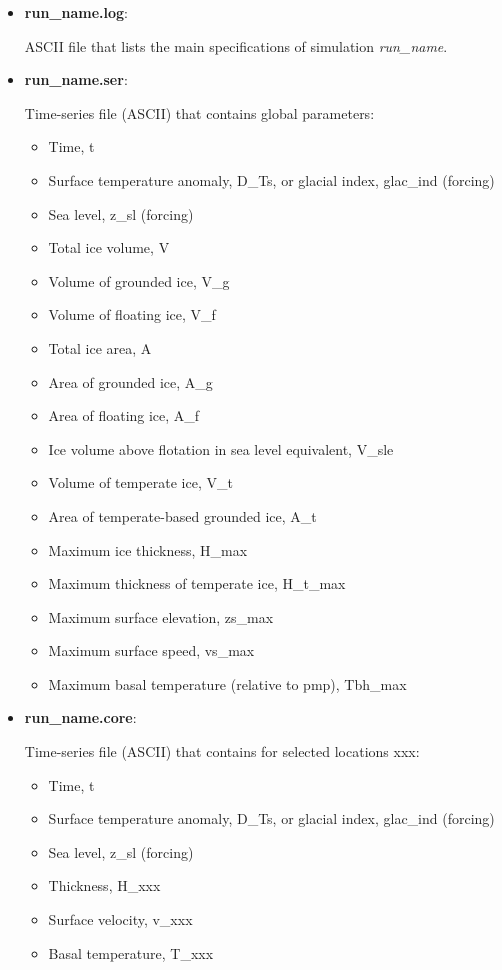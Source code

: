 \documentclass[12pt,a4paper]{article}
\begin{document}
\begin{itemize}

\item \textbf{run\_name.log}:

ASCII file that lists the main specifications of simulation \emph{run\_name}.

\item \textbf{run\_name.ser}:

Time-series file (ASCII) that contains global parameters:
\begin{itemize}
\item Time, t
\item Surface temperature anomaly, D\_Ts, or glacial index, glac\_ind (forcing)
\item Sea level, z\_sl (forcing)
\item Total ice volume, V
\item Volume of grounded ice, V\_g
\item Volume of floating ice, V\_f
\item Total ice area, A
\item Area of grounded ice, A\_g
\item Area of floating ice, A\_f
\item Ice volume above flotation in sea level equivalent, V\_sle
\item Volume of temperate ice, V\_t
\item Area of temperate-based grounded ice, A\_t
\item Maximum ice thickness, H\_max
\item Maximum thickness of temperate ice, H\_t\_max
\item Maximum surface elevation, zs\_max
\item Maximum surface speed, vs\_max
\item Maximum basal temperature (relative to pmp), Tbh\_max
\end{itemize}

\item \textbf{run\_name.core}:

Time-series file (ASCII) that contains for selected locations xxx:
\begin{itemize}
\item Time, t
\item Surface temperature anomaly, D\_Ts, or glacial index, glac\_ind (forcing)
\item Sea level, z\_sl (forcing)
\item Thickness, H\_xxx
\item Surface velocity, v\_xxx
\item Basal temperature, T\_xxx
\end{itemize}


\end{itemize}
\end{document}
